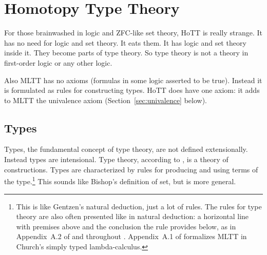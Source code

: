\documentclass[11pt]{article}
\begin{document}
\section{Homotopy Type Theory}

For those brainwashed in logic and ZFC-like set theory, HoTT is really strange.
It has no need for logic and set theory.  It eats them.  It has logic
and set theory inside it.  They become parts of type theory.
So type theory is not a theory in first-order logic or any other logic.

Also MLTT has no axioms (formulas in some logic asserted to be true).
Instead it is formulated as rules for constructing types.
HoTT does have one axiom: it adds to MLTT the univalence axiom
(Section~\ref{sec:univalence} below).

\subsection{Types}

Types, the fundamental concept of type theory, are not defined
extensionally.
Instead types are intensional.  Type theory, according to
\citet[near the beginning of the first lecture]{bauer-hott},
is a theory of constructions.  Types are characterized by
rules for producing and using terms of the type.\footnote{This is like
Gentzen's natural deduction, just a lot of rules.  The rules for type theory
are also often presented like in natural deduction: a horizontal line
with premises above and the conclusion the rule provides below,
as in Appendix~A.2 of  and throughout \citet{rijke}.
Appendix~A.1 of  formalizes MLTT in Church's
simply typed lambda-calculus.}
This sounds like Bishop's definition of set, but is more general.
\end{document}
